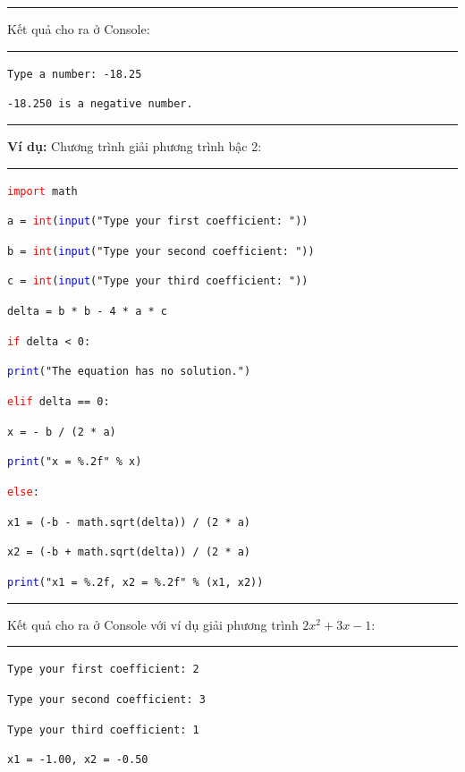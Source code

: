 \rule{\linewidth}{0.2mm}\par
\noindent
\resetlinenumber
Kết quả cho ra ở Console:\\
\rule{\linewidth}{0.2mm}\par
\begin{linenumbers}
	\texttt{Type a number: -18.25}\par
	\texttt{-18.250 is a negative number.}
\end{linenumbers}
\rule{\linewidth}{0.2mm}\par
\resetlinenumber
\newpage
\textbf{Ví dụ:} Chương trình giải phương trình bậc 2:\\
\rule{\linewidth}{0.2mm}\par
\begin{linenumbers}
	\texttt{\textcolor{red}{import} math}\par
	\bigskip
	\texttt{a = \textcolor{red}{int}(\textcolor{blue}{input}("Type your first coefficient: "))}\par
	\texttt{b = \textcolor{red}{int}(\textcolor{blue}{input}("Type your second coefficient: "))}\par
	\texttt{c = \textcolor{red}{int}(\textcolor{blue}{input}("Type your third coefficient: "))}\par
	\texttt{delta = b * b - 4 * a * c}\par
	\texttt{\textcolor{red}{if} delta < 0:}\par
	\qquad \texttt{\textcolor{blue}{print}("The equation has no solution.")}\par
	\texttt{\textcolor{red}{elif} delta == 0:}\par
	\qquad \texttt{x = - b / (2 * a)}\par
	\qquad \texttt{\textcolor{blue}{print}("x = \%.2f" \% x)}\par
	\texttt{\textcolor{red}{else}:}\par
	\qquad \texttt{x1 = (-b - math.sqrt(delta)) / (2 * a)}\par
	\qquad \texttt{x2 = (-b + math.sqrt(delta)) / (2 * a)}\par
	\qquad \texttt{\textcolor{blue}{print}("x1 = \%.2f, x2 = \%.2f" \% (x1, x2))}\par
\end{linenumbers}
\rule{\linewidth}{0.2mm}\par
\noindent
\resetlinenumber
Kết quả cho ra ở Console với ví dụ giải phương trình $2x^2 + 3x - 1$:\\
\rule{\linewidth}{0.2mm}\par
\begin{linenumbers}
	\texttt{Type your first coefficient: 2}\par
	\texttt{Type your second coefficient: 3}\par
	\texttt{Type your third coefficient: 1}\par
	\texttt{x1 = -1.00, x2 = -0.50}
\end{linenumbers}
